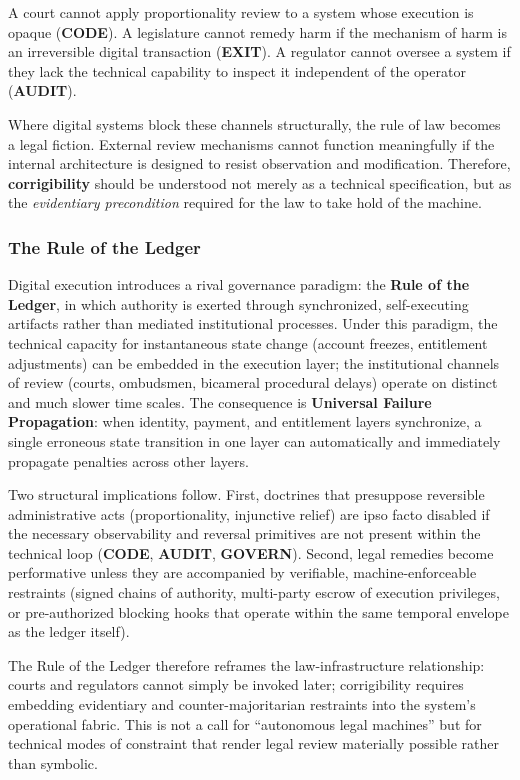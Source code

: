 \documentclass{article}
\begin{document}
A court cannot apply proportionality review to a system whose execution is opaque (\textbf{CODE}). A legislature cannot remedy harm if the mechanism of harm is an irreversible digital transaction (\textbf{EXIT}). A regulator cannot oversee a system if they lack the technical capability to inspect it independent of the operator (\textbf{AUDIT}).

Where digital systems block these channels structurally, the rule of law becomes a legal fiction. External review mechanisms cannot function meaningfully if the internal architecture is designed to resist observation and modification. Therefore, \textbf{corrigibility} should be understood not merely as a technical specification, but as the \textit{evidentiary precondition} required for the law to take hold of the machine.

\subsubsection{The Rule of the Ledger}

Digital execution introduces a rival governance paradigm: the \textbf{Rule of the Ledger}, in which authority is exerted through synchronized, self-executing artifacts rather than mediated institutional processes. Under this paradigm, the technical capacity for instantaneous state change (account freezes, entitlement adjustments) can be embedded in the execution layer; the institutional channels of review (courts, ombudsmen, bicameral procedural delays) operate on distinct and much slower time scales. The consequence is \textbf{Universal Failure Propagation}: when identity, payment, and entitlement layers synchronize, a single erroneous state transition in one layer can automatically and immediately propagate penalties across other layers.

Two structural implications follow. First, doctrines that presuppose reversible administrative acts (proportionality, injunctive relief) are ipso facto disabled if the necessary observability and reversal primitives are not present within the technical loop (\textbf{CODE}, \textbf{AUDIT}, \textbf{GOVERN}). Second, legal remedies become performative unless they are accompanied by verifiable, machine-enforceable restraints (signed chains of authority, multi-party escrow of execution privileges, or pre-authorized blocking hooks that operate within the same temporal envelope as the ledger itself).

The Rule of the Ledger therefore reframes the law-infrastructure relationship: courts and regulators cannot simply be invoked later; corrigibility requires embedding evidentiary and counter-majoritarian restraints into the system's operational fabric. This is not a call for ``autonomous legal machines'' but for technical modes of constraint that render legal review materially possible rather than symbolic.
\end{document}
